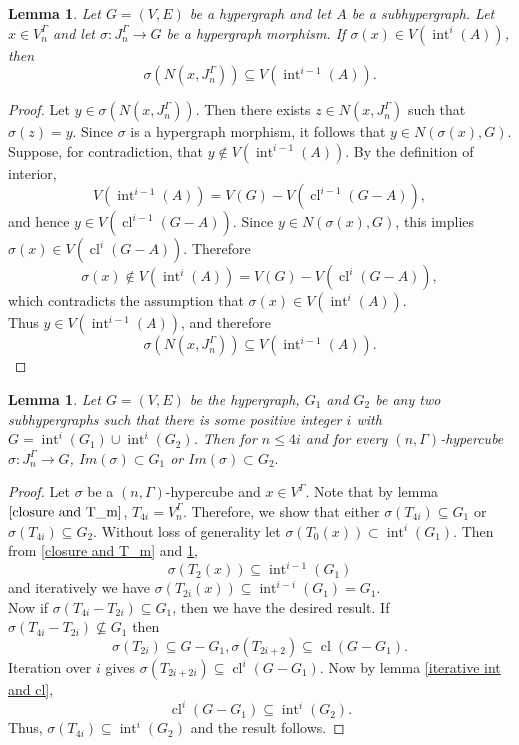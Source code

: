 \documentclass[11pt]{amsart}
\newtheorem{lem}[subsection]{Lemma}
\newcommand{\cl}{\operatorname{cl}}
\renewcommand{\int}{\operatorname{int}}
\begin{document}
\begin{lem}\label{gamma interior}
Let $G=(V,E)$ be a hypergraph and let $A$ be a subhypergraph. Let $x\in V_n^\Gamma$ and let
$\sigma:J_n^\Gamma\to G$ be a hypergraph morphism. If
$\sigma(x)\in V(\int^{i}(A))$, then
\[
\sigma(N(x,J_n^\Gamma))\subseteq V(\int^{i-1}(A)).
\]
\end{lem}

\begin{proof}
Let $y\in \sigma(N(x,J_n^\Gamma))$. Then there exists
$z\in N(x,J_n^\Gamma)$ such that $\sigma(z)=y$.
Since $\sigma$ is a hypergraph morphism, it follows that
$y\in N(\sigma(x),G)$.\\
%
Suppose, for contradiction, that $y\notin V(\int^{i-1}(A))$.
By the definition of interior,
\[
V(\int^{i-1}(A))=V(G)- V(\cl^{i-1}(G-A)),
\]
and hence $y\in V(\cl^{i-1}(G-A))$.
Since $y\in N(\sigma(x),G)$, this implies
$\sigma(x)\in V(\cl^{i}(G-A))$.
Therefore
\[
\sigma(x)\notin V(\int^{i}(A))
= V(G)- V(\cl^{i}(G-A)),
\]
which contradicts the assumption that
$\sigma(x)\in V(\int^{i}(A))$.\\
%
Thus $y\in V(\int^{i-1}(A))$, and therefore
\[
\sigma(N(x,J_n^\Gamma))\subseteq V(\int^{i-1}(A)).
\]
\end{proof}



\begin{lem}\label{gamma excision-like proof}
	Let $G=(V, E)$ be the hypergraph, $G_1$ and $G_2$ be any two subhypergraphs such that there is some positive integer $i$ with $G=\int^i(G_1)\cup \int^i(G_2)$. Then for $n\leq 4i$ and for every $(n,\Gamma)$-hypercube $\sigma: J_n^\Gamma \rightarrow G$, $Im(\sigma)\subset G_1$ or $Im(\sigma) \subset G_2.$
\end{lem}
\begin{proof} Let $\sigma$ be a $(n,\Gamma)$-hypercube and $x\in V^\Gamma.$ Note that by lemma $\ref{closure and T_m}$, $T_{4i}=V_n^\Gamma$. Therefore, we show that either $\sigma(T_{4i})\subseteq G_1$ or $\sigma(T_{4i})\subseteq G_2$. Without loss of generality let  $\sigma(T_0(x))\subset \int^i(G_1)$. Then from \ref{closure and T_m} and \ref{gamma interior},  
\[\sigma(T_2(x))\subseteq \int^{i-1}(G_1)\] 
and iteratively we have $\sigma(T_{2i}(x))\subseteq \int^{i-i}(G_1)=G_1$.\\ 
Now if $\sigma(T_{4i}-T_{2i})\subseteq G_1$, then we have the desired result. If $\sigma(T_{4i}-T_{2i})\not\subseteq G_1$ then \[\sigma(T_{2i})\subseteq G-G_1, \sigma(T_{2i+2})\subseteq \cl(G-G_1).\] Iteration over $i$ gives $\sigma(T_{2i+2i})\subseteq \cl^i(G-G_1).$ Now by lemma \ref{iterative int and cl}, 
\[\cl^i(G-G_1)\subseteq\int^i(G_2).\] Thus, $\sigma(T_{4i})\subseteq \int^i(G_2)$ and the result follows.
\end{proof}
\end{document}

